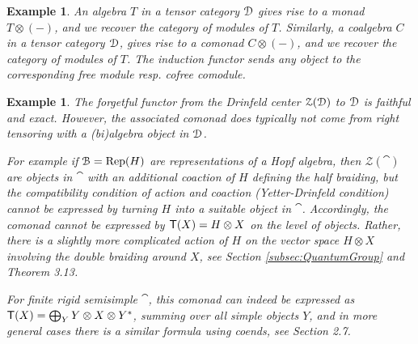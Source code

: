 \documentclass[a4paper, reqno]{amsart}
\newtheorem{example}[theorem]{Example}
\theoremstyle{introTheorems}
\newcommand\cZ{\mathcal{Z}}
\newcommand\Rep{\textup{Rep}}
\renewcommand{\1}{\mathbbold{1}}
\begin{document}
\begin{example}
An algebra $T$ in a tensor category $\mathcal{D}$ gives rise to a monad $T\otimes(-)$, and we recover the category of modules of $T$. Similarly,  a coalgebra $C$ in  a tensor category $\mathcal{D}$, gives rise to a comonad $C\otimes(-)$, and we recover the category of modules of $T$. The induction functor sends any object to the corresponding free module resp. cofree comodule.
\end{example}
\begin{example}\label{exm_centralcomonad}
The forgetful functor from the Drinfeld center $\cZ(\catD)$ to $\mathcal{D}$ is faithful and exact. However, the associated comonad does typically not come from right tensoring with a (bi)algebra object in $\mathcal{D}$. 

For example if $\cat=\Rep(H)$ are representations of a Hopf algebra, then  $\cZ(\cat)$ are objects in $\cat$ with an additional coaction of $H$ defining the half braiding, but the compatibility condition of action and coaction (Yetter-Drinfeld condition) cannot be expressed by turning $H$ into a suitable object in $\cat$. Accordingly, the comonad cannot be expressed by ${\mathsf{T}}(X)=H\otimes X$ on the level of objects. Rather, there is a slightly more complicated action of $H$ on the vector space $H\otimes X$ involving the double braiding around $X$, see Section \ref{subsec:QuantumGroup} and \cite{LW21} Theorem 3.13. 

For finite rigid semisimple $\cat$, this comonad can indeed be expressed as $ {\mathsf{T}}(X)=\bigoplus_Y Y\otimes X\otimes Y^*$, summing over all simple objects $Y$, and in more general cases there is a similar formula using coends, see \cite{Shim19} Section 2.7.
\end{example}
\end{document}
